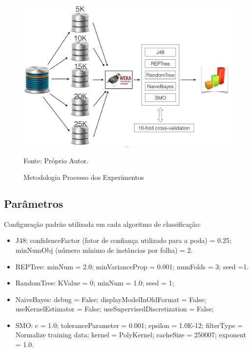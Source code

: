 \documentclass[
	12pt,				%
	openright,			%
	oneside,	
	a4paper,				%
	english,				%
	brazil				%
]{abntex2/abntex2} %
\begin{document}
	
	\begin{figure}[!htb]
		\caption{\label{figmetodologiaExperimentos} \fontsize{10}{\baselineskip} \selectfont Metodologia Processo dos Experimentos}
		\begin{center}
			\includegraphics[scale=0.55]{img/metodologiaExperimentos.png}
		\end{center}
		{\fontsize{10}{\baselineskip} \selectfont Fonte: Próprio Autor.}
	\end{figure}
	\vspace{-1.5\baselineskip}
	\subsection{Parâmetros }
	\vspace{1\baselineskip}
	Configuração padrão utilizada em cada algoritmo de classificação:
	
	\begin{itemize}
		\item J48: confidenceFactor  (fator de confiança utilizado para a poda) = 0.25; minNumObj (número mínimo de instâncias por folha) = 2.
		\item REPTree: minNum = 2.0; minVarianceProp = 0.001; numFolds = 3; seed =1.
		\item RandomTree: KValue = 0; minNum = 1.0; seed = 1;
		\item NaiveBayes: debug = False; displayModelInOldFormat = False; useKernelEstimator = False; useSupervisedDiscretization = False;
		\item SMO: c = 1.0; toleranceParameter = 0.001; epsilon = 1.0E-12; filterType = Normalize training data; kernel = PolyKernel; cacheSize = 250007; exponent = 1.0.
	\end{itemize}
	\vspace{-1.5\baselineskip}
\end{document}
